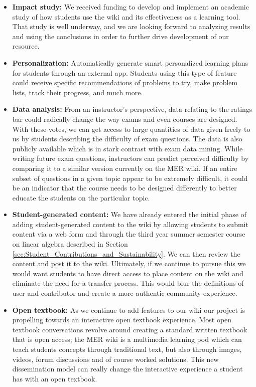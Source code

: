 \documentclass{primus}
\begin{document}
\begin{itemize}  
\item \textbf{Impact study:} We received funding to develop and implement an academic study of how students use the wiki and its effectiveness as a learning tool.  That study is well underway, and we are looking forward to analyzing results and using the conclusions in order to further drive development of our resource.
\item \textbf{Personalization:} Automatically generate smart personalized learning plans for students through an external app. Students using this type of feature could receive specific recommendations of problems to try, make problem lists, track their progress, and much more.
\item \textbf{Data analysis:} From an instructor’s perspective, data relating to the ratings bar could radically change the way exams and even courses are designed. With these votes, we can get access to large quantities of data given freely to us by students describing the difficulty of exam questions. The data is also publicly available which is in stark contrast with exam data mining. While writing future exam questions, instructors can predict perceived difficulty by comparing it to a similar version currently on the MER wiki. If an entire subset of questions in a given topic appear to be extremely difficult, it could be an indicator that the course needs to be designed differently to better educate the students on the particular topic.
\item \textbf{Student-generated content:} We have already entered the initial phase of adding student-generated content to the wiki by allowing students to submit content via a web form and through the third year summer semester course on linear algebra described in Section \ref{sec:Student_Contributions_and_Sustainability}. We can then review the content and post it to the wiki. Ultimately, if we continue to pursue this we would want students to have direct access to place content on the wiki and eliminate the need for a transfer process. This would blur the definitions of user and contributor and create a more authentic community experience.
\item \textbf{Open textbook:}  As we continue to add features to our wiki our project is propelling towards an interactive open textbook experience. Most open textbook conversations revolve around creating a standard written textbook that is open access; the MER wiki is a multimedia learning pod which can teach students concepts through traditional text, but also through images, videos, forum discussions and of course worked solutions. This new dissemination model can really change the interactive experience a student has with an open textbook.
\end{itemize}
\end{document}
